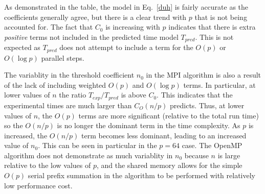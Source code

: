 \documentclass[12pt]{article}
\begin{document}
\begin{algorithm}
{{{{As demonstrated in the table, the model in
Eq.~\eqref{duh} is fairly accurate as the coefficients generally agree, but there is
a clear trend with $p$ that is not being accounted for.  The fact that $C_0$ is increasing
with $p$ indicates that there is extra \emph{positive} terms not included in the
predicted time model $T_{pred}$.  This is not expected as $T_{pred}$ does not attempt
to include a term for the $O(p)$ or $O(\log p)$ parallel steps.   

The variablity in the threshold coefficient $n_0$ in the MPI algorithm is also a result of the lack of
including weighted $O(p)$ and $O(\log p)$ terms.  In particular, at lower values of
$n$ the ratio $T_{exp}/T_{pred}$ is above $C_0$.  This indicates that the
experimental times are much larger than $C_O(n/p)$ predicts.  Thus, at lower values of
$n$, the $O(p)$ terms are more significant (relative to the total run time) so the
$O(n/p)$ is no longer the dominant term in the time complexity.  As $p$ is increased,
the $O(n/p)$ term becomes less dominant, leading to an increased value of $n_0$. This
can be seen in particular in the $p=64$ case.  The OpenMP algorithm does not
demonstrate as much variablity in $n_0$ because $n$ is large relative to the low
values of $p$, and the shared memory allows for the simple $O(p)$ serial prefix
summation in the algorithm to be performed with relatively low performance cost.

}}}}
\end{algorithm}
\end{document}
